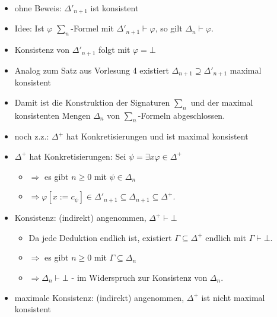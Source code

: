 \documentclass[a4paper]{article}
\begin{document}
\begin{multicols}{3}
\begin{enumerate}
          \begin{itemize}
            \item
                  ohne Beweis: $\Delta'_{n+1}$ ist konsistent
            \item
                  Idee: Ist $\varphi$ $\sum_n$-Formel mit
                  $\Delta'_{n+1}\vdash\varphi$, so gilt $\Delta_n\vdash\varphi$.
            \item
                  Konsistenz von $\Delta'_{n+1}$ folgt mit $\varphi=\bot$
            \item
                  Analog zum Satz aus Vorlesung 4 existiert
                  $\Delta_{n+1}\supseteq \Delta'_{n+1}$ maximal konsistent
          \end{itemize}
  \end{enumerate}

  \begin{itemize}
    \itemsep1pt\parskip0pt
    \item
          Damit ist die Konstruktion der Signaturen $\sum_n$ und der maximal
          konsistenten Mengen $\Delta_n$ von $\sum_n$-Formeln abgeschlossen.
    \item
          noch z.z.: $\Delta^+$ hat Konkretisierungen und ist maximal konsistent
    \item
          $\Delta^+$ hat Konkretisierungen: Sei
          $\psi=\exists x\varphi\in\Delta^+$

          \begin{itemize}
            \item
                  $\Rightarrow$ es gibt $n\geq 0$ mit $\psi\in\Delta_n$
            \item
                  $\Rightarrow \varphi[x:=c_{\psi}]\in\Delta'_{n+1}\subseteq \Delta_{n+1}\subseteq\Delta^+$.
          \end{itemize}
    \item
          Konsistenz: (indirekt) angenommen, $\Delta^+\vdash\bot$

          \begin{itemize}
            \item
                  Da jede Deduktion endlich ist, existiert $\Gamma\subseteq\Delta^+$
                  endlich mit $\Gamma\vdash\bot$.
            \item
                  $\Rightarrow$ es gibt $n\geq 0$ mit $\Gamma\subseteq\Delta_n$
            \item
                  $\Rightarrow \Delta_n\vdash\bot$ - im Widerspruch zur Konsistenz von
                  $\Delta_n$.
          \end{itemize}
    \item
          maximale Konsistenz: (indirekt) angenommen, $\Delta^+$ ist nicht
          maximal konsistent


\end{itemize}
\end{multicols}
\end{document}
